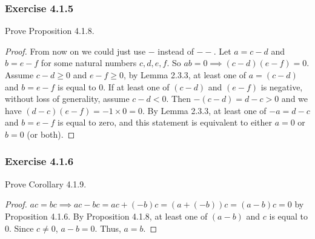 \documentclass[12pt, letter]{article}
\begin{document}
\subsubsection*{Exercise 4.1.5}
Prove Proposition 4.1.8.
\begin{proof}
    From now on we could just use $-$ instead of $--$. Let $a=c-d$ and $b=e-f$ for some natural numbers $c,d,e,f$. So $ab=0\implies (c-d)(e-f)=0$.
    Assume $c-d\geq 0$ and $e-f\geq 0$, by Lemma 2.3.3, at least one of $a=(c-d)$ and $b=e-f$ is equal to 0. If at least one of $(c-d)$ and $(e-f)$ 
    is negative, without loss of generality, assume $c-d<0$. Then $-(c-d)=d-c>0$ and we have $(d-c)(e-f)=-1\times 0=0$. By Lemma 2.3.3, 
    at least one of $-a=d-c$ and $b=e-f$ is equal to zero, and this statement is equivalent to either $a=0$ or $b=0$ (or both). 
\end{proof}
\subsubsection*{Exercise 4.1.6}
Prove Corollary 4.1.9.
\begin{proof}
    $ac=bc\implies ac-bc=ac+(-b)c=(a+(-b))c=(a-b)c=0$ by Proposition 4.1.6. By Proposition 4.1.8, at least one of $(a-b)$ and $c$ is equal to 0. Since 
    $c\ne 0$, $a-b=0$. Thus, $a=b$.
\end{proof}
\end{document}
